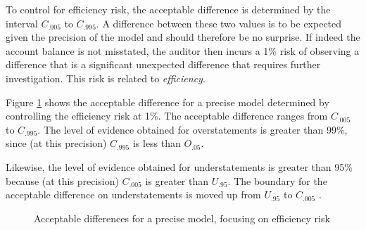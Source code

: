 \documentclass[12pt,a4paper]{memoir}
\begin{document}
To control\label{mar:controlling_efficiency_risk} for efficiency risk, the acceptable difference is determined by the interval $C_{.005}$ to $C_{.995}$. A difference between these two values is to be expected given the precision of the model and should therefore be no surprise. If indeed the account balance is not misstated, the auditor then incurs a 1\% risk of observing a difference that is a significant unexpected difference that requires further investigation. This risk is related to \emph{efficiency}. 

Figure \ref{fig:method_efficiency_precise} shows the acceptable difference for a precise model determined by controlling the efficiency risk at 1\%. The acceptable difference ranges from $C_{.005}$ to $C_{.995}$. The level of evidence obtained for overstatements is greater than 99\%, since (at this precision) $C_{.995}$ is less than $O_{.05}$. 

Likewise, the level of evidence obtained for understatements is greater than 95\% because (at this precision) $C_{.005}$ is greater than $U_{.95}$. The boundary for the acceptable difference on understatements is moved up from $U_{.95}$ to $C_{.005}$
.

\begin{figure} 
\begin{center}
\caption{Acceptable differences for a precise model, focusing on efficiency risk}

\label{fig:method_efficiency_precise}
\end{center}
\end{figure}
\end{document}
